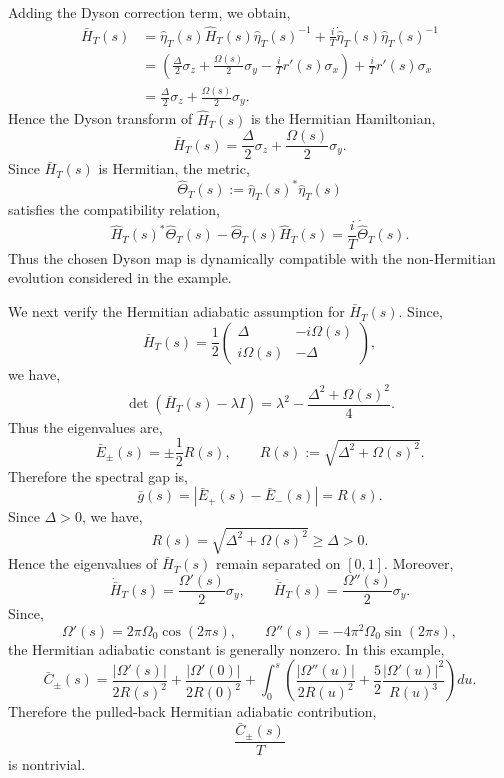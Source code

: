 \documentclass[pdflatex,sn-mathphys-num]{sn-jnl}
\theoremstyle{thmstyleone}
\theoremstyle{thmstyletwo}
\theoremstyle{thmstylethree}
\begin{document}
Adding the Dyson correction term, we obtain,
\[
\begin{aligned}
\bar H_T(s)
&=
\hat\eta_T(s)\hat H_T(s)\hat\eta_T(s)^{-1}
+
\frac{i}{T}\dot{\hat\eta}_T(s)\hat\eta_T(s)^{-1} \\
&=
\left(
\frac{\Delta}{2}\sigma_z
+
\frac{\Omega(s)}{2}\sigma_y
-
\frac{i}{T}r'(s)\sigma_x
\right)
+
\frac{i}{T}r'(s)\sigma_x \\
&=
\frac{\Delta}{2}\sigma_z
+
\frac{\Omega(s)}{2}\sigma_y.
\end{aligned}
\]
Hence the Dyson transform of \(\hat H_T(s)\) is the Hermitian Hamiltonian,
\[
\bar H_T(s)
=
\frac{\Delta}{2}\sigma_z
+
\frac{\Omega(s)}{2}\sigma_y.
\]
Since \(\bar H_T(s)\) is Hermitian, the metric,
\[
\hat\Theta_T(s):=\hat\eta_T(s)^*\hat\eta_T(s)
\]
satisfies the compatibility relation,
\[
\hat H_T(s)^*\hat\Theta_T(s)-\hat\Theta_T(s)\hat H_T(s)
=
\frac{i}{T}\dot{\hat\Theta}_T(s).
\]
Thus the chosen Dyson map is dynamically compatible with the non-Hermitian
evolution considered in the example.

We next verify the Hermitian adiabatic assumption for \(\bar H_T(s)\). Since,
\[
\bar H_T(s)
=
\frac12
\begin{pmatrix}
\Delta&-i\Omega(s)\\
i\Omega(s)&-\Delta
\end{pmatrix},
\]
we have,
\[
\det(\bar H_T(s)-\lambda I)
=
\lambda^2-\frac{\Delta^2+\Omega(s)^2}{4}.
\]
Thus the eigenvalues are,
\[
\bar E_{\pm}(s)
=
\pm \frac{1}{2}R(s),
\qquad
R(s):=\sqrt{\Delta^2+\Omega(s)^2}.
\]
Therefore the spectral gap is,
\[
\bar g(s)
=
|\bar E_+(s)-\bar E_-(s)|
=
R(s).
\]
Since \(\Delta>0\), we have,
\[
R(s)=\sqrt{\Delta^2+\Omega(s)^2}\ge\Delta>0.
\]
Hence the eigenvalues of \(\bar H_T(s)\) remain separated on
\([0,1]\).
Moreover,
\[
\dot{\bar H}_T(s)=\frac{\Omega'(s)}{2}\sigma_y,
\qquad
\ddot{\bar H}_T(s)=\frac{\Omega''(s)}{2}\sigma_y.
\]
Since,
\[
\Omega'(s)=2\pi\Omega_0\cos(2\pi s),
\qquad
\Omega''(s)=-4\pi^2\Omega_0\sin(2\pi s),
\]
the Hermitian adiabatic constant is generally nonzero. In this example,
\[
\bar C_{\pm}(s)
=
\frac{|\Omega'(s)|}{2R(s)^2}
+
\frac{|\Omega'(0)|}{2R(0)^2}
+
\int_0^s
\left(
\frac{|\Omega''(u)|}{2R(u)^2}
+
\frac{5}{2}\frac{|\Omega'(u)|^2}{R(u)^3}
\right)du.
\]
Therefore the pulled-back Hermitian adiabatic contribution,
\[
\frac{\bar C_{\pm}(s)}{T}
\]
is nontrivial.
\end{document}
